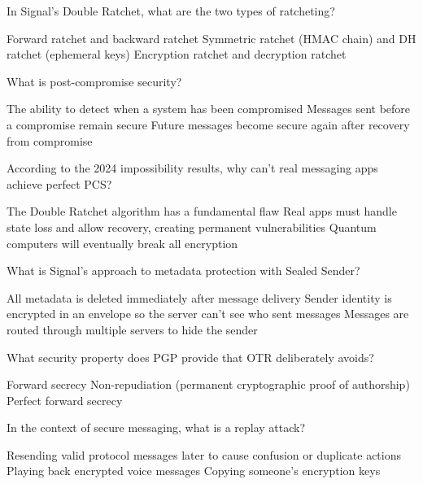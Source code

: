 \documentclass[10pt,a4paper,american]{exam}
\begin{document}
\begin{questions}
	\question In Signal's Double Ratchet, what are the two types of ratcheting?
	\begin{randomizechoices}
		\choice Forward ratchet and backward ratchet
		\CorrectChoice Symmetric ratchet (HMAC chain) and DH ratchet (ephemeral keys)
		\choice Encryption ratchet and decryption ratchet
	\end{randomizechoices}

	\question What is post-compromise security?
	\begin{randomizechoices}
		\choice The ability to detect when a system has been compromised
		\choice Messages sent before a compromise remain secure
		\CorrectChoice Future messages become secure again after recovery from compromise
	\end{randomizechoices}

	\question According to the 2024 impossibility results, why can't real messaging apps achieve perfect PCS?
	\begin{randomizechoices}
		\choice The Double Ratchet algorithm has a fundamental flaw
		\CorrectChoice Real apps must handle state loss and allow recovery, creating permanent vulnerabilities
		\choice Quantum computers will eventually break all encryption
	\end{randomizechoices}

	\question What is Signal's approach to metadata protection with Sealed Sender?
	\begin{randomizechoices}
		\choice All metadata is deleted immediately after message delivery
		\CorrectChoice Sender identity is encrypted in an envelope so the server can't see who sent messages
		\choice Messages are routed through multiple servers to hide the sender
	\end{randomizechoices}

	\question What security property does PGP provide that OTR deliberately avoids?
	\begin{randomizechoices}
		\choice Forward secrecy
		\CorrectChoice Non-repudiation (permanent cryptographic proof of authorship)
		\choice Perfect forward secrecy
	\end{randomizechoices}

	\question In the context of secure messaging, what is a replay attack?
	\begin{randomizechoices}
		\CorrectChoice Resending valid protocol messages later to cause confusion or duplicate actions
		\choice Playing back encrypted voice messages
		\choice Copying someone's encryption keys
	\end{randomizechoices}


\end{questions}
\end{document}
